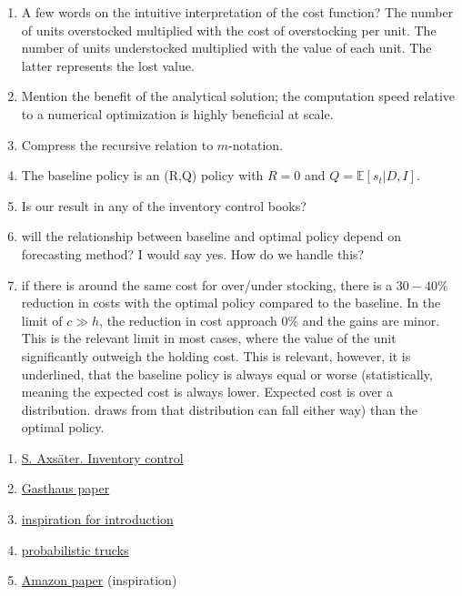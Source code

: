 \documentclass[a4paper,12pt]{article}
\begin{document}
	\begin{enumerate}
		\item A few words on the intuitive interpretation of the cost function? The number of units overstocked multiplied with the cost of overstocking per unit. The number of units understocked multiplied with the value of each unit. The latter represents the lost value.
		\item Mention the benefit of the analytical solution; the computation speed relative to a numerical optimization is highly beneficial at scale.
		\item Compress the recursive relation to $m$-notation. 
		\item The baseline policy is an (R,Q) policy with $R =0$ and $Q = \mathbb{E}[s_t|D,I]$.
		\item Is our result in any of the inventory control books?
		\item will the relationship between baseline and optimal policy depend on forecasting method? I would say yes. How do we handle this?
		
		\item if there is around the same cost for over/under stocking, there is a $30-40\%$ reduction in costs with the optimal policy compared to the baseline. In the limit of $c\gg h$, the reduction in cost approach $0\%$ and the gains are minor. This is the relevant limit in most cases, where the value of the unit significantly outweigh the holding cost. This is relevant, however, it is underlined, that the baseline policy is always equal or worse (statistically, meaning the expected cost is always lower. Expected cost is over a distribution. draws from that distribution can fall either way) than the optimal policy. 
	\end{enumerate}
	
	\begin{enumerate}
		\item \href{https://www.academia.edu/27965536/Inventorycontroltextbook_140429044831_phpapp02_1_}{S. Axsäter. Inventory control}
		\item \href{https://proceedings.mlr.press/v151/kan22a/kan22a.pdf}{Gasthaus paper}
		\item \href{https://arxiv.org/pdf/2012.02392}{inspiration for introduction}
		\item \href{https://arxiv.org/pdf/2310.17168}{probabilistic trucks}
		\item \href{https://arxiv.org/pdf/2310.16096}{Amazon paper} (inspiration)
	\end{enumerate}
	
	\newpage
	\begin{appendices}
		
		
		
	\end{appendices}
	
	
	
	
	
	
\end{document}

